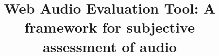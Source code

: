 \documentclass{sig-alternate}
\begin{document}
\title{Web Audio Evaluation Tool: A framework for subjective assessment of audio}
%
%
%
%
%
\end{document}

